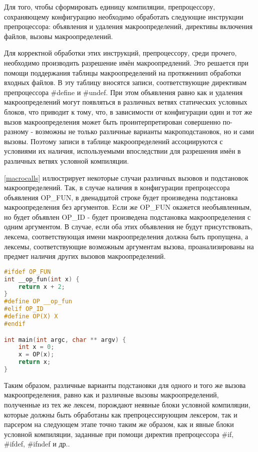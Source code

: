 Для того, чтобы сформировать единицу компиляции, препроцессору, сохраняющему конфигурацию необходимо обработать следующие инструкции препроцессора: объявления и удаления макроопределений, директивы включения файлов, вызовы макроопределений.

Для корректной обработки этих инструкций, препроцессору, среди прочего, необходимо производить разрешение имён макроопредлений. Это решается при помощи поддержания таблицы макроопределений на протяжениип обработки входных файлов. В эту таблицу вносятся записи, соответствующие директивам препроцессора \#define и \#undef. При этом объявления равно как и удаления макроопределений могут появляться в различных ветвях статических условных блоков, что приводит к тому, что, в зависимости от конфигурации один и тот же вызов макроопределения может быть проинтерпретирован совершенно по-разному - возможны не только различные варианты макроподстановок, но и сами вызовы. Поэтому записи в таблице макроопределений ассоциируются с условиями их наличия, используемыми впоследствии для разрешения имён в различных ветвях условной компиляции.

\autoref{macrocalls} иллюстрирует некоторые случаи различных вызовов и подстановок макроопределений. Так, в случае наличия в конфигурации препроцессора объявления OP\_FUN, в двенадцатой строке будет произведена подстановка макроопределения без аргументов. Eсли же OP\_FUN окажется необъявленным, но будет объявлен OP\_ID - будет произведена подстановка макроопределения с одним аргументом. В случае, если оба этих объявления не будут присутствовать, лексема, соответствующая имени макроопределения должна быть пропущена, а лексемы, соответствующие возможным аргументам вызова, проанализированы на предмет наличия других вызовов макроопределений.

\begin{minipage}{\linewidth}
\begin{lstlisting}[caption={Различные вызовы макроопределения при различных конфигурациях препроцессора},language=C,label=macrocalls]
#ifdef OP_FUN
int __op_fun(int x) {
	return x + 2;
}
#define OP __op_fun
#elif OP_ID
#define OP(X) X
#endif

int main(int argc, char ** argv) {
	int x = 0;
	x = OP(x);
	return x;	
}
\end{lstlisting}
\end{minipage}

Таким образом, различные варианты подстановки для одного и того же вызова макроопределения, равно как и различные вызовы макроопределений, полученные из тех же лексем, порождают неявные блоки условной компиляции, которые должны быть обработаны как препроцессирующим лексером, так и парсером на следующем этапе точно таким же образом, как и явные блоки условной компиляции, заданные при помощи директив препроцессора \#if, \#ifdef, \#ifndef и др..

